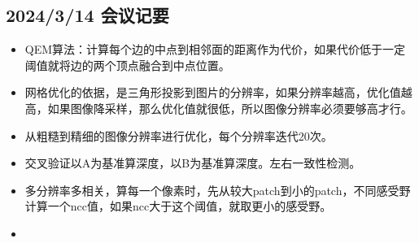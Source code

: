 \subsection{2024/3/14 会议记要}

\begin{itemize}
    \item QEM算法：计算每个边的中点到相邻面的距离作为代价，如果代价低于一定阈值就将边的两个顶点融合到中点位置。
    \item 网格优化的依据，是三角形投影到图片的分辨率，如果分辨率越高，优化值越高，如果图像降采样，那么优化值就很低，所以图像分辨率必须要够高才行。
    \item 从粗糙到精细的图像分辨率进行优化，每个分辨率迭代20次。
    \item 交叉验证以A为基准算深度，以B为基准算深度。左右一致性检测。
    \item 多分辨率多相关，算每一个像素时，先从较大patch到小的patch，不同感受野计算一个ncc值，如果ncc大于这个阈值，就取更小的感受野。
    \item 
\end{itemize}